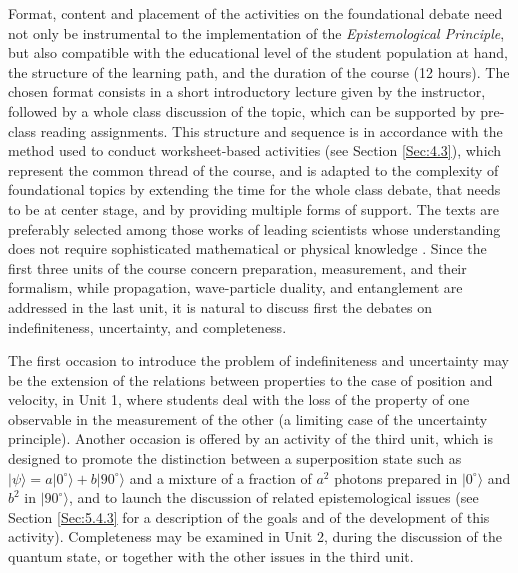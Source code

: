 \documentclass[twocolumn,secnumarabic,amssymb, nobibnotes, aps, prd, nofootinbib]{revtex4-2}
\begin{document}
Format, content and placement of the activities on the foundational debate need not only be instrumental to the implementation of the \textit{Epistemological Principle}, but also compatible with the educational level of the student population at hand, the structure of the learning path, and the duration of the course (12 hours).
The chosen format consists in a short introductory lecture given by the instructor, followed by a whole class discussion of the topic, which can be supported by pre-class reading assignments. This structure and sequence is in accordance with the method used to conduct worksheet-based activities (see Section \ref{Sec:4.3}), which represent the common thread of the course, and is adapted to the complexity of foundational topics by extending the time for the whole class debate, that needs to be at center stage, and by providing multiple forms of support. The texts are preferably selected among those works of leading scientists whose understanding does not require sophisticated mathematical or physical knowledge \cite[e.g., excerpts from][]{Schilpp1998, Bell2010}. Since the first three units of the course concern preparation, measurement, and their formalism, while propagation, wave-particle duality, and entanglement are addressed in the last unit, it is natural to discuss first the debates on indefiniteness, uncertainty, and completeness.

The first occasion to introduce the problem of indefiniteness and uncertainty may be the extension of the relations between properties to the case of position and velocity, in Unit 1, where students deal with the loss of the property of one observable in the measurement of the other (a limiting case of the uncertainty principle). Another occasion is offered by an activity of the third unit, which is designed to promote the distinction between a superposition state such as $|\psi\rangle=a|0^{\circ}\rangle+b|90^{\circ}\rangle$ and a mixture of a fraction of $a^2$ photons prepared in $|0^{\circ}\rangle$ and $b^2$ in $|90^{\circ}\rangle$, and to launch the discussion of related epistemological issues (see Section \ref{Sec:5.4.3} for a description of the goals and of the development of this activity). Completeness may be examined in Unit 2, during the discussion of the quantum state, or together with the other issues in the third unit.
\end{document}

